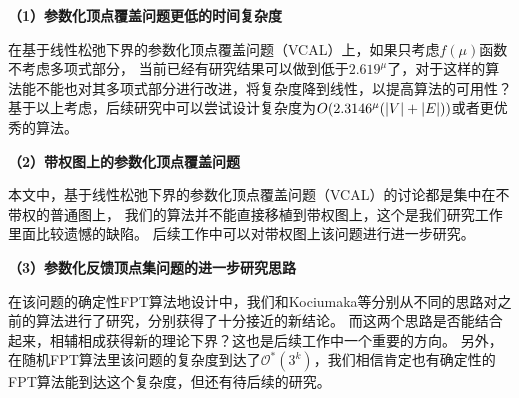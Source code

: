 \textbf{（1）参数化顶点覆盖问题更低的时间复杂度} 

在基于线性松弛下界的参数化顶点覆盖问题（VCAL）上，如果只考虑$f(\mu)$函数不考虑多项式部分，
当前已经有研究结果可以做到低于$2.619^\mu$了，对于这样的算法能不能也对其多项式部分进行改进，将复杂度降到线性，以提高算法的可用性？
基于以上考虑，后续研究中可以尝试设计复杂度为$O(2.3146^\mu(\left\vert V \right\vert + \left\vert E \right\vert))$或者更优秀的算法。
   
\textbf{（2）带权图上的参数化顶点覆盖问题} 

本文中，基于线性松弛下界的参数化顶点覆盖问题（VCAL）的讨论都是集中在不带权的普通图上，
我们的算法并不能直接移植到带权图上，这个是我们研究工作里面比较遗憾的缺陷。
后续工作中可以对带权图上该问题进行进一步研究。
   
\textbf{（3）参数化反馈顶点集问题的进一步研究思路} 

在该问题的确定性FPT算法地设计中，我们和Kociumaka等分别从不同的思路对之前的算法进行了研究，分别获得了十分接近的新结论。
而这两个思路是否能结合起来，相辅相成获得新的理论下界？这也是后续工作中一个重要的方向。
另外，在随机FPT算法里该问题的复杂度到达了$\mathcal{O}^*(3^k)$，我们相信肯定也有确定性的FPT算法能到达这个复杂度，但还有待后续的研究。